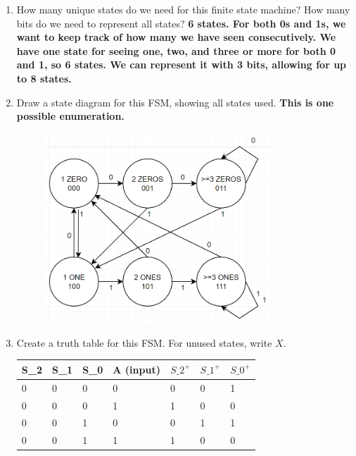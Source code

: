 \documentclass{article}
\begin{document}
\begin{enumerate}[label=\alph*.]
\item How many unique states do we need for this finite state machine? How many bits do we need to represent all states?
\textbf{6 states. For both 0s and 1s, we want to keep track of how many we have seen consecutively. We have one state for seeing one, two, and three or more for both 0 and 1, so 6 states. We can represent it with 3 bits, allowing for up to 8 states. }
\item Draw a state diagram for this FSM, showing all states used.
\textbf{This is one possible enumeration.}
\begin{figure}[!h]
    \centering
    \includegraphics[width=0.8\textwidth]{figures/fsm1b-solution.png}
\end{figure}
\item Create a truth table for this FSM. For unused states, write $X$.
\begin{table}[!h]
\begin{tabular}{|l|l|l|l|l|l|l|}
\hline
S\_2 & S\_1 & S\_0 & A (input) & $S\_2^+$ & $S\_1^+$ & $S\_0^+$ \\ \hline
0    & 0    & 0    & 0         & 0                       & 0                       & 1                       \\ \hline
0    & 0    & 0    & 1         & 1                       & 0                       & 0                       \\ \hline
0    & 0    & 1    & 0         & 0                       & 1                       & 1                       \\ \hline
0    & 0    & 1    & 1         & 1                       & 0                       & 0                       \\ \hline

\end{tabular}
\end{table}
\end{enumerate}
\end{document}
